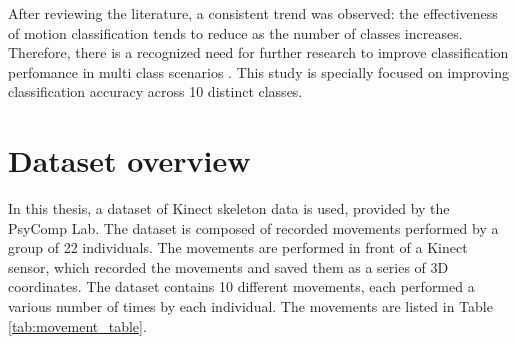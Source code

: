       \vspace{0.5cm}
      After reviewing the literature, a consistent trend was observed: the effectiveness of motion classification tends to reduce as the number of classes increases. Therefore, there is a recognized need for further research to improve classification perfomance in multi class scenarios \cite{acis_classification_2023}. This study is specially focused on improving classification accuracy across 10 distinct classes.

   \section{Dataset overview}
      
      In this thesis, a dataset of Kinect skeleton data is used, provided by the PsyComp Lab. The dataset is composed of recorded movements performed by a group of 22 individuals. The movements are performed in front of a Kinect sensor, which recorded the movements and saved them as a series of 3D coordinates. The dataset contains 10 different movements, each performed a various number of times by each individual. The movements are listed in Table \ref{tab:movement_table}.

      \newpage

